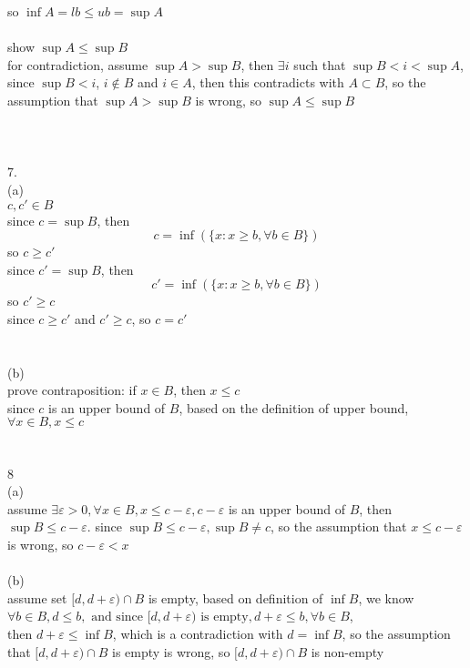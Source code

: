 \documentclass[12pt, border = 4pt, multi]{article} %
\begin{document}
so $\inf A = lb \leq ub = \sup A$\\
\\
show $\sup A \leq \sup B$\\
for contradiction, assume $\sup A > \sup B$, then $\exists i$ such that $\sup B < i < \sup A$, since $\sup B < i$, $i \not\in B$ and $i \in A$, then this contradicts with $A \subset B$, so the assumption that $\sup A > \sup B$ is wrong, so $\sup A \leq \sup B$\\
\\
\\
\\
7.\\
(a)\\
$c, c' \in B$\\
since $c = \sup B$, then
\[c = \inf(\{x: x \geq b, \forall b \in B\})\]
so $c \geq c'$\\
since $c' = \sup B$, then
\[c' = \inf(\{x: x \geq b, \forall b \in B\})\]
so $c' \geq c$\\
since $c \geq c'$ and $c' \geq c$, so $c = c'$\\
\\
\\
(b)\\
prove contraposition: if $x \in B$, then $x \leq c$\\
since $c$ is an upper bound of $B$, based on the definition of upper bound, $\forall x \in B, x \leq c$\\
\\
\\
8\\
(a)\\
assume $\exists \varepsilon > 0, \forall x \in B, x \leq c - \varepsilon, c - \varepsilon$ is an upper bound of $B$, then $\sup B \leq c - \varepsilon$. since $\sup B \leq c - \varepsilon, \sup B \not= c$, so the assumption that $x \leq c - \varepsilon$ is wrong, so $c - \varepsilon < x$\\
\\
(b)\\
assume set $[d, d + \varepsilon) \cap B$ is empty, based on definition of $\inf B$, we know $\forall b \in B, d \leq b, \text{ and since } [d, d + \varepsilon) \text{ is empty}, d + \varepsilon \leq b, \forall b \in B$,\\
then $d + \varepsilon \leq \inf B$, which is a contradiction with $d = \inf B$, so the assumption that $[d, d + \varepsilon) \cap B$ is empty is wrong, so $[d, d + \varepsilon) \cap B$ is non-empty
\end{document}
